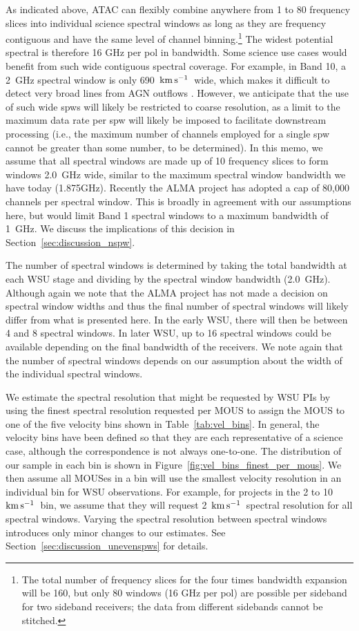 \documentclass[preprint]{aastex631}
\newcommand{\kms}{\ensuremath{\rm{ km \, s^{-1}}}}
\begin{document}
As indicated above, ATAC can flexibly combine anywhere from 1 to 80 frequency slices into individual science spectral windows as long as they are frequency contiguous and have the same level of channel binning.\footnote{The total number of frequency slices for the four times bandwidth expansion will be 160, but only 80 windows (16 GHz per pol)  are possible per sideband for two sideband receivers; the data from different sidebands cannot be stitched.} The widest potential spectral is therefore 16 GHz per pol in bandwidth. Some science use cases would benefit from such wide contiguous spectral coverage. For example, in Band 10, a 2~GHz spectral window is only 690~\kms\ wide, which makes it difficult to detect very broad lines from AGN outflows \citep{Carpenter2022TheUpgrade}. However, we anticipate that the use of such wide spws will likely be restricted to coarse resolution, as a limit to the maximum data rate per spw will likely be imposed to facilitate downstream processing (i.e., the maximum number of channels employed for a single spw cannot be greater than some number, to be determined).  In this memo, we assume that all spectral windows are made up of 10 frequency slices to form windows 2.0~GHz wide, similar to the maximum spectral window bandwidth we have today (1.875GHz). Recently the ALMA project has adopted a cap of 80,000 channels per spectral window. This is broadly in agreement with our assumptions here, but would limit Band 1 spectral windows to a maximum bandwidth of 1~GHz. We discuss the implications of this decision in Section~\ref{sec:discussion_nspw}.

The number of spectral windows is determined by taking the total bandwidth at each WSU stage and dividing by the spectral window bandwidth (2.0~GHz). Although again we note that the ALMA project has not made a decision on spectral window widths and thus the final number of spectral windows will likely differ from what is presented here. In the early WSU, there will then be between 4 and 8  spectral windows. In later WSU, up to 16 spectral windows could be available depending on the final bandwidth of the receivers. We note again that the number of spectral windows depends on our assumption about the width of the individual spectral windows. 

We estimate the spectral resolution that might be requested by WSU PIs by using the finest spectral resolution requested per MOUS to assign the MOUS to one of the five velocity bins shown in Table~\ref{tab:vel_bins}. In general, the velocity bins have been defined so that they are each representative of a science case, although the correspondence is not always one-to-one. The distribution of our sample in each bin is shown in Figure~\ref{fig:vel_bins_finest_per_mous}. We then assume all MOUSes in a bin will use the smallest velocity resolution in an individual bin for WSU observations. For example, for projects in the 2 to 10 \kms\ bin, we assume that they will request 2~\kms\ spectral resolution for all spectral windows.  Varying the spectral resolution between spectral windows introduces only minor changes to our estimates. See Section~\ref{sec:discussion_unevenspws} for details.
\end{document}
